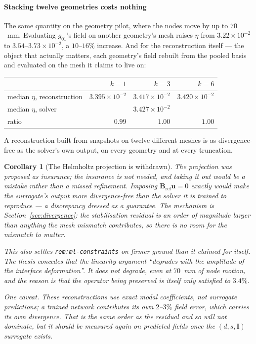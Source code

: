 \documentclass[11pt,a4paper]{article}
\newcommand{\vect}[1]{\mathbf{#1}}
\theoremstyle{plain}
\newtheorem{corollary}[proposition]{Corollary}
\theoremstyle{definition}
\theoremstyle{remark}
\begin{document}
\paragraph{Stacking twelve geometries costs nothing}
The same quantity on the geometry pilot, where the nodes move by up to $70$~mm.
Evaluating $g_{01}$'s field on another geometry's mesh raises $\eta$ from
$3.22\times10^{-2}$ to $3.54$--$3.73\times10^{-2}$, a $10$--$16\%$ increase. And
for the reconstruction itself --- the object that actually matters, each
geometry's field rebuilt from the pooled basis and evaluated on the mesh it
claims to live on:
\begin{center}
\small
\begin{tabular}{@{}lrrr@{}}
\toprule
& $k=1$ & $k=3$ & $k=6$ \\
\midrule
median $\eta$, reconstruction & $3.395\times10^{-2}$ & $3.417\times10^{-2}$ & $3.420\times10^{-2}$ \\
median $\eta$, solver         & \multicolumn{3}{c}{$3.427\times10^{-2}$} \\
ratio                          & $0.99$ & $1.00$ & $1.00$ \\
\bottomrule
\end{tabular}
\end{center}
A reconstruction built from snapshots on twelve different meshes is as
divergence-free as the solver's own output, on every geometry and at every
truncation.

\begin{corollary}[The Helmholtz projection is withdrawn]
\label{cor:no-projection}
The projection was proposed as insurance; the insurance is not needed, and
taking it out would be a mistake rather than a missed refinement. Imposing
$\vect{B}_{\mathrm{ref}}\vect{u} = 0$ exactly would make the surrogate's output
\emph{more} divergence-free than the solver it is trained to reproduce --- a
discrepancy dressed as a guarantee. The mechanism is
Section~\ref{sec:divergence}: the stabilisation residual is an order of
magnitude larger than anything the mesh mismatch contributes, so there is no
room for the mismatch to matter.

This also settles \texttt{rem:ml-constraints} on firmer ground than it claimed
for itself. The thesis concedes that the linearity argument ``degrades with the
amplitude of the interface deformation''. It does not degrade, even at $70$~mm
of node motion, and the reason is that the operator being preserved is itself
only satisfied to $3.4\%$.

One caveat. These reconstructions use exact modal coefficients, not surrogate
predictions; a trained network contributes its own $2$--$3\%$ field error, which
carries its own divergence. That is the same order as the residual and so will
not dominate, but it should be measured again on predicted fields once the
$(d,s,\vect{I})$ surrogate exists.
\end{corollary}
\end{document}
